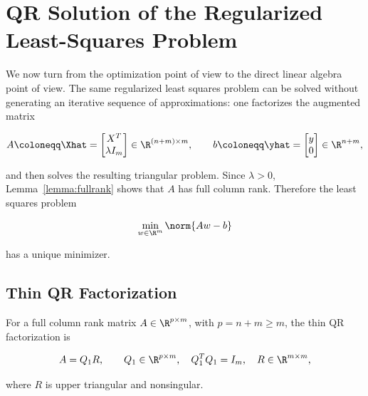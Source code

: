 \label{sec:qr}

\section{QR Solution of the Regularized Least-Squares Problem}
\label{sec:qr_solution}

\noindent We now turn from the optimization point of view to the direct linear algebra point 
of view. The same regularized least squares problem can be solved without generating 
an iterative sequence of approximations: one factorizes the augmented matrix

\begin{equation}
    A \coloneqq \Xhat =
    \begin{bmatrix}
        X^T \\ \lambda I_m
    \end{bmatrix}
    \in \R^{(n+m)\times m},
    \qquad
    b \coloneqq \yhat =
    \begin{bmatrix}
        y \\ 0
    \end{bmatrix}
    \in \R^{n+m},
\end{equation}

\noindent and then solves the resulting triangular problem. Since $\lambda > 0$, 
Lemma~\ref{lemma:fullrank} shows that $A$ has full column rank. Therefore the 
least squares problem

\begin{equation}
    \min_{w\in\R^m} \norm{Aw-b}
\end{equation}

\noindent has a unique minimizer.

\subsection{Thin QR Factorization}

\noindent For a full column rank matrix $A\in\R^{p\times m}$, with $p=n+m\geq m$, the thin QR 
factorization is

\begin{equation}
\label{eq:thin_qr}
    A = Q_1 R,
    \qquad
    Q_1 \in \R^{p\times m}, \quad Q_1^T Q_1 = I_m,
    \quad
    R \in \R^{m\times m},
\end{equation}

\noindent where $R$ is upper triangular and nonsingular.


